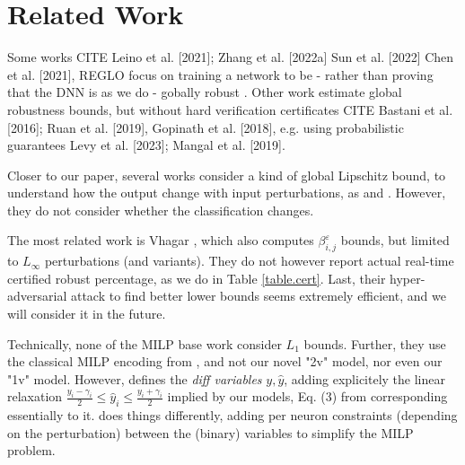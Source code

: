\section{Related Work}

Some works CITE
Leino et al. [2021]; Zhang et al. [2022a] Sun et al. [2022]  Chen et al. [2021], REGLO focus on training a network to be - rather than proving that the DNN is as we do - gobally robust .
Other work estimate global robustness bounds, but without hard verification certificates CITE Bastani et al. [2016]; Ruan et al. [2019], Gopinath et al. [2018], e.g. using probabilistic guarantees  Levy et al. [2023]; Mangal et al. [2019].

Closer to our paper, several works consider a kind of global Lipschitz bound, to understand how the output change with input perturbations, as \cite{Marabou} and \cite{ITNE,GROCET}. However, they do not consider whether the classification changes. 

The most related work is Vhagar \cite{vhagar}, which also computes $\beta^\varepsilon_{i,j}$ bounds, but limited to $L_\infty$ perturbations (and variants). They do not however report actual 
real-time certified robust percentage, as we do in Table \ref{table.cert}. Last, their hyper-adversarial attack to find better lower bounds seems extremely efficient, and we will consider it in the future.

Technically, none of the MILP base work \cite{vhagar,ITNE,GROCET} 
consider $L_1$ bounds. Further, they use the classical MILP encoding from \cite{MILP}, and not our novel "2v" model, nor even our "1v" model. However, \cite{ITNE,GROCET} 
defines the {\em diff variables} $y,\hat{y}$, adding explicitely the linear relaxation $\frac{y_i-\gamma_i}{2} \leq \hat{y}_i \leq \frac{y_i+\gamma_i}{2}$ implied by our models, Eq. (3) from \cite{ITNE} corresponding essentially to it. \cite{vhagar} does things differently, adding per neuron constraints (depending on the perturbation) between the (binary) variables to simplify the MILP problem. 


